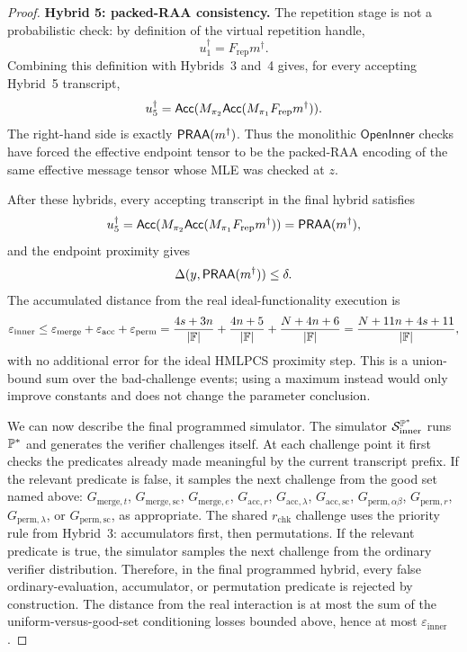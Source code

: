 \begin{proof}
\smallskip\noindent\textbf{Hybrid 5: packed-RAA consistency.}
The repetition stage is not a probabilistic check: by definition of the
virtual repetition handle,
\[
  u_1^\dagger=F_{\mathrm{rep}}m^\dagger.
\]
Combining this definition with Hybrids~3 and~4 gives, for every accepting
Hybrid~5 transcript,
\[
  u_5^\dagger
  =
  \mathsf{Acc}(M_{\pi_2}\mathsf{Acc}(M_{\pi_1}F_{\mathrm{rep}}m^\dagger)).
\]
The right-hand side is exactly \(\mathsf{PRAA}(m^\dagger)\).  Thus the monolithic
\(\mathsf{OpenInner}\) checks have forced the effective endpoint tensor to be
the packed-RAA encoding of the same effective message tensor whose MLE was
checked at \(z\).

After these hybrids, every accepting transcript in the final hybrid satisfies
\[
  u_5^\dagger
  =
  \mathsf{Acc}(M_{\pi_2}\mathsf{Acc}(M_{\pi_1}F_{\mathrm{rep}}m^\dagger))
  =
  \mathsf{PRAA}(m^\dagger),
\]
and the endpoint proximity gives
\[
  \Delta(y,\mathsf{PRAA}(m^\dagger))\le\delta.
\]
The accumulated distance from the real ideal-functionality execution is
\[
  \varepsilon_{\mathrm{inner}}
  \le
  \varepsilon_{\mathrm{merge}}
  +\varepsilon_{\mathrm{acc}}
  +\varepsilon_{\mathrm{perm}}
  =
  \frac{4s+3n}{|\mathbb{F}|}
  +\frac{4n+5}{|\mathbb{F}|}
  +\frac{N+4n+6}{|\mathbb{F}|}
  =
  \frac{N+11n+4s+11}{|\mathbb{F}|},
\]
with no additional error for the ideal HMLPCS proximity step.  This is a
union-bound sum over the bad-challenge events; using a maximum instead would
only improve constants and does not change the parameter conclusion.

We can now describe the final programmed simulator.  The simulator
\(\mathcal S_{\mathrm{inner}}^{\mathbb{P}^\ast}\) runs \(\mathbb{P}^\ast\) and
generates the verifier challenges itself.  At each challenge point it first
checks the predicates already made meaningful by the current transcript prefix.
If the relevant predicate is false, it samples the next challenge from the good
set named above: \(G_{\mathrm{merge},t}\),
\(G_{\mathrm{merge},\mathrm{sc}}\), \(G_{\mathrm{merge},e}\),
\(G_{\mathrm{acc},r}\), \(G_{\mathrm{acc},\lambda}\),
\(G_{\mathrm{acc},\mathrm{sc}}\), \(G_{\mathrm{perm},\alpha\beta}\),
\(G_{\mathrm{perm},r}\), \(G_{\mathrm{perm},\lambda}\), or
\(G_{\mathrm{perm},\mathrm{sc}}\), as appropriate.  The shared
\(r_{\mathrm{chk}}\) challenge uses the priority rule from Hybrid~3:
accumulators first, then permutations.  If the relevant predicate is true, the
simulator samples the next challenge from the ordinary verifier distribution.
Therefore, in the final programmed hybrid, every false ordinary-evaluation,
accumulator, or permutation predicate is rejected by construction.  The
distance from the real interaction is at most the sum of the
uniform-versus-good-set conditioning losses bounded above, hence at most
\(\varepsilon_{\mathrm{inner}}\).


\end{proof}
